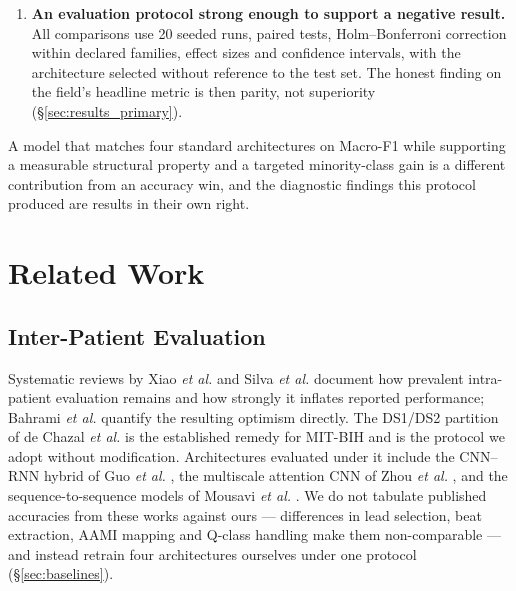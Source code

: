\documentclass[journal,twoside,web]{ieeecolor}
\begin{document}
\begin{enumerate}
    \item \textbf{An evaluation protocol strong enough to support a negative result.} All comparisons use 20 seeded runs, paired tests, Holm--Bonferroni correction within declared families, effect sizes and confidence intervals, with the architecture selected without reference to the test set. The honest finding on the field's headline metric is then parity, not superiority (\S\ref{sec:results_primary}).
\end{enumerate}

A model that matches four standard architectures on Macro-F1 while supporting a measurable structural property and a targeted minority-class gain is a different contribution from an accuracy win, and the diagnostic findings this protocol produced are results in their own right.

\section{Related Work}
\label{sec:related_work}

\subsection{Inter-Patient Evaluation}
Systematic reviews by Xiao \emph{et al.} \cite{xiao_deep_2023} and Silva \emph{et al.} \cite{silva_systematic_2025} document how prevalent intra-patient evaluation remains and how strongly it inflates reported performance; Bahrami \emph{et al.} \cite{bahrami_investigation_2025} quantify the resulting optimism directly. The DS1/DS2 partition of de Chazal \emph{et al.} \cite{chazal_automatic_2004} is the established remedy for MIT-BIH and is the protocol we adopt without modification. Architectures evaluated under it include the CNN--RNN hybrid of Guo \emph{et al.} \cite{guo_inter-patient_2019}, the multiscale attention CNN of Zhou \emph{et al.} \cite{zhou_inter-patient_2024}, and the sequence-to-sequence models of Mousavi \emph{et al.} \cite{mousavi_inter-_2019}. We do not tabulate published accuracies from these works against ours --- differences in lead selection, beat extraction, AAMI mapping and Q-class handling make them non-comparable --- and instead retrain four architectures ourselves under one protocol (\S\ref{sec:baselines}).
\end{document}
